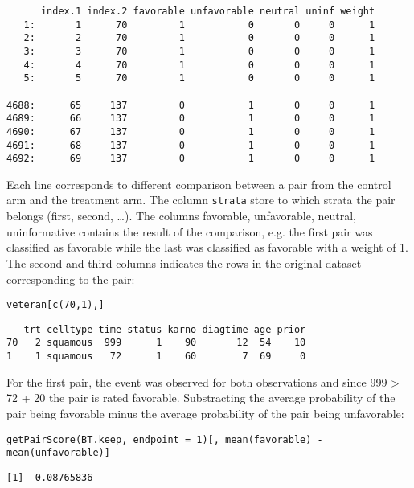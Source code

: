 \documentclass[12pt]{article}
\begin{document}
\begin{verbatim}
      index.1 index.2 favorable unfavorable neutral uninf weight
   1:       1      70         1           0       0     0      1
   2:       2      70         1           0       0     0      1
   3:       3      70         1           0       0     0      1
   4:       4      70         1           0       0     0      1
   5:       5      70         1           0       0     0      1
  ---                                                           
4688:      65     137         0           1       0     0      1
4689:      66     137         0           1       0     0      1
4690:      67     137         0           1       0     0      1
4691:      68     137         0           1       0     0      1
4692:      69     137         0           1       0     0      1
\end{verbatim}

Each line corresponds to different comparison between a pair from the
control arm and the treatment arm. The column \texttt{strata} store to which
strata the pair belongs (first, second, \ldots{}). The columns favorable,
unfavorable, neutral, uninformative contains the result of the
comparison, e.g. the first pair was classified as favorable while the
last was classified as favorable with a weight of 1. The second and
third columns indicates the rows in the original dataset corresponding
to the pair:
\lstset{language=r,label= ,caption= ,captionpos=b,numbers=none}
\begin{lstlisting}
veteran[c(70,1),]
\end{lstlisting}

\begin{verbatim}
   trt celltype time status karno diagtime age prior
70   2 squamous  999      1    90       12  54    10
1    1 squamous   72      1    60        7  69     0
\end{verbatim}


For the first pair, the event was observed for both observations and
since 999 > 72 + 20 the pair is rated favorable. Substracting the
average probability of the pair being favorable minus the average
probability of the pair being unfavorable:
\lstset{language=r,label= ,caption= ,captionpos=b,numbers=none}
\begin{lstlisting}
getPairScore(BT.keep, endpoint = 1)[, mean(favorable) - mean(unfavorable)]
\end{lstlisting}

\begin{verbatim}
[1] -0.08765836
\end{verbatim}
\end{document}

